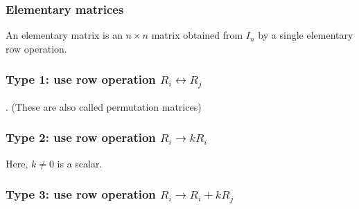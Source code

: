\documentclass[11pt,t]{beamer}
\begin{document}
\begin{frame}
\frametitle{Elementary matrices}
\begin{definition}
An \alert{elementary matrix} is an $n\times n$ matrix obtained from $I_n$ by a \alert{single} elementary row operation.
\end{definition}

\begin{example}

\vspace{2in}

\end{example}
\end{frame}
\begin{frame}
\frametitle{Type 1: use row operation $R_i\leftrightarrow R_j$}.
(These are also called permutation matrices)

\end{frame}
\begin{frame}
\frametitle{Type 2: use row operation $R_i\to kR_i$}
Here, $k\neq 0$ is a scalar.

\end{frame}
\begin{frame}
\frametitle{Type 3: use row operation $R_i\to R_i+kR_j$}


\end{frame}
\end{document}
